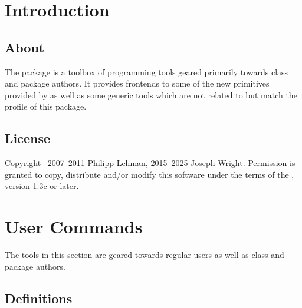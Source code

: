 \documentclass{ltxdockit}[2010/09/26]
\begin{document}
\printtitlepage
\tableofcontents

\section{Introduction}
\label{int}

\subsection[About]{About }

The  package is a toolbox of programming tools geared primarily towards \latex class and package authors. It provides \latex frontends to some of the new primitives provided by \etex as well as some generic tools which are not related to \etex but match the profile of this package.

\subsection{License}

Copyright \textcopyright\ 2007--2011 Philipp Lehman, 2015--2025 Joseph Wright. Permission is granted to copy, distribute and\slash or modify this software under the terms of the \lppl, version 1.3c or later.

\section{User Commands}
\label{use}

The tools in this section are geared towards regular users as well as class and package authors.

\subsection{Definitions}
\label{use:def}
\end{document}
